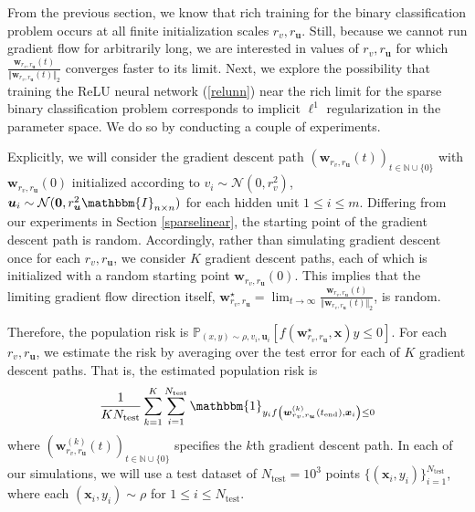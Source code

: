 \documentclass{article}
\begin{document}
From the previous section, we know that rich training for the binary classification problem occurs at all finite initialization scales $r_v, r_{\boldsymbol{u}}$. Still, because we cannot run gradient flow for arbitrarily long, we are interested in values of $r_v, r_{\boldsymbol{u}}$ for which $\frac{\boldsymbol{w}_{r_v, r_{\boldsymbol{u}}}(t)}{\Vert \boldsymbol{w}_{r_v, r_{\boldsymbol{u}}}(t) \Vert_2}$ converges faster to its limit. Next, we explore the possibility that training the ReLU neural network (\ref{relunn}) near the rich limit for the sparse binary classification problem corresponds to implicit $\ell^1$ regularization in the parameter space. We do so by conducting a couple of experiments.

Explicitly, we will consider the gradient descent path $(\boldsymbol{w}_{r_v, r_{\boldsymbol{u}}}(t))_{t \in \mathbb{N} \cup \{0\}}$ with $\boldsymbol{w}_{r_v, r_{\boldsymbol{u}}}(0)$ initialized according to $v_i \sim \mathcal{N}(0, r_v^2)$, $\boldsymbol{u}_i \sim \mathcal{N}(\boldsymbol{0}, r_{\boldsymbol{u}}^2 \mathbbm{I}_{n \times n})$ for each hidden unit $1 \leq i \leq m$. Differing from our experiments in Section \ref{sparselinear}, the starting point of the gradient descent path is random. Accordingly, rather than simulating gradient descent once for each $r_v, r_{\boldsymbol{u}}$, we consider $K$ gradient descent paths, each of which is initialized with a random starting point $\boldsymbol{w}_{r_v, r_{\boldsymbol{u}}}(0)$. This implies that the limiting gradient flow direction itself, $\boldsymbol{w}_{r_v, r_{\boldsymbol{u}}}^{\star} = \lim_{t \to \infty} \frac{\boldsymbol{w}_{r_v, r_{\boldsymbol{u}}}(t)}{\Vert \boldsymbol{w}_{r_v, r_{\boldsymbol{u}}}(t) \Vert_2}$, is random. 

Therefore, the population risk is $\mathbb{P}_{(x,y) \sim \rho, v_i, \boldsymbol{u}_i}[f(\boldsymbol{w}_{r_v, r_{\boldsymbol{u}}}^{\star}, \boldsymbol{x})y \leq 0]$. For each $r_v, r_{\boldsymbol{u}}$, we estimate the risk by averaging over the test error for each of $K$ gradient descent paths. That is, the estimated population risk is
\begin{align*}
    \frac{1}{KN_{\text{test}}}\sum_{k=1}^K \sum_{i=1}^{N_{\text{test}}} \mathbbm{1}_{y_i f\left(\boldsymbol{w}_{r_v, r_{\boldsymbol{u}}}^{(k)}(t_{\text{end}}), \boldsymbol{x}_i\right) \leq 0}
\end{align*}
where $\left(\boldsymbol{w}_{r_v, r_{\boldsymbol{u}}}^{(k)}(t) \right)_{t \in \mathbb{N} \cup \{0\}}$ specifies the $k$th gradient descent path. In each of our simulations, we will use a test dataset of $N_{\text{test}} = 10^3$ points $\{(\boldsymbol{x}_i, y_i) \}_{i=1}^{N_{\text{test}}}$, where each $(\boldsymbol{x}_i, y_i) \sim \rho$ for $1 \leq i \leq N_{\text{test}}$.
\end{document}
